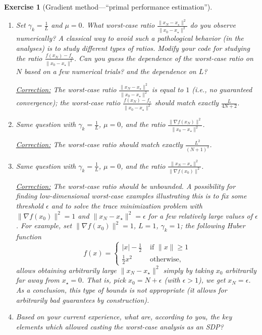 \documentclass[11pt,a4paper]{article}
\newcommand{\correction}[1]{{{\color{blue}\underline{Correction:} #1}}}
\newcommand{\correction}[1]{}
\newtheorem{exercise}{Exercise}
\begin{document}
\begin{exercise}[Gradient method---``primal performance estimation'']
\begin{enumerate}
	\item Set $\gamma_k=\tfrac{1}{L}$ and $\mu=0$. What worst-case ratio $\frac{\|x_{N}-x_\star\|^2}{\|x_0-x_\star\|^2}$ do you observe numerically? A classical way to avoid such a pathological behavior  (in the analyses) is to study different types of ratios. Modify your code for studying the ratio $\frac{f(x_N)-f_\star}{\|x_0-x_\star\|^2}$. Can you guess the dependence of the worst-case ratio on $N$ based on a few numerical trials? and the dependence on $L$?
	
	\correction{The worst-case ratio $\frac{\|x_{N}-x_\star\|^2}{\|x_0-x_\star\|^2}$ is equal to $1$ (i.e., no guaranteed convergence); the worst-case ratio $\frac{f(x_N)-f_\star}{\|x_0-x_\star\|^2}$ should match exactly $\frac{L}{4N+2}$.}
	
	
	\item Same question with $\gamma_k=\tfrac{1}{L}$, $\mu=0$, and the ratio $\frac{\|\nabla f(x_N)\|^2}{\|x_0-x_\star\|^2}$.
	
	\correction{The worst-case ratio should match exactly $\frac{L^2}{(N+1)^2}$.}
	
	\item Same question with $\gamma_k=\tfrac{1}{L}$, $\mu=0$, and the ratio $\frac{\|x_N-x_\star\|^2}{\|\nabla f(x_0)\|^2}$.
	
	\correction{The worst-case ratio should be unbounded. A possibility for finding low-dimensional worst-case examples illustrating this is to fix some threshold $\epsilon$ and to solve the trace minimization problem with $\|\nabla f(x_0)\|^2=1$ and $\|x_N-x_\star\|^2=\epsilon$ for a few relatively large values of $\epsilon$. For example, set $\|\nabla f(x_0)\|^2=1$, $L=1$, $\gamma_k=1$; the following Huber function
\begin{equation}
f(x)=\left\{\begin{array}{ll}
|x| - \tfrac{1}{2} & \text{ if } \|x\|\geqslant 1\\
\tfrac{1}{2}x^2 & \text{ otherwise, }
\end{array}\right.
\end{equation}	
allows obtaining arbitrarily large $\|x_N-x_\star\|^2$ simply by taking $x_0$ arbitrarily far away from $x_\star=0$. That is, pick $x_0=N+\epsilon$ (with $\epsilon>1$), we get $x_N=\epsilon$. As a conclusion, this type of bounds is not appropriate (it allows for arbitrarily bad guarantees by construction).}
	
	\item Based on your current experience, what are, according to you, the key elements which allowed casting the worst-case analysis as an SDP?
	

\end{enumerate}
\end{exercise}
\end{document}

